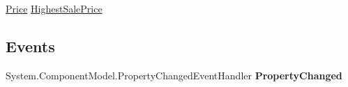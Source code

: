 \begin{DoxyCompactItemize}
\begin{DoxyCompactList}\small\item\em \end{DoxyCompactList}\item 
\hypertarget{class_price___comparison_1_1amazon_1_1ecs_1_1_collections_collection_collection_summary_aff84be041514c4e98b847dba6d03fac7}{\hyperlink{class_price___comparison_1_1amazon_1_1ecs_1_1_price}{Price} \hyperlink{class_price___comparison_1_1amazon_1_1ecs_1_1_collections_collection_collection_summary_aff84be041514c4e98b847dba6d03fac7}{Highest\-Sale\-Price}}\label{class_price___comparison_1_1amazon_1_1ecs_1_1_collections_collection_collection_summary_aff84be041514c4e98b847dba6d03fac7}

\begin{DoxyCompactList}\small\item\em \end{DoxyCompactList}\end{DoxyCompactItemize}
\subsection*{Events}
\begin{DoxyCompactItemize}
\item 
\hypertarget{class_price___comparison_1_1amazon_1_1ecs_1_1_collections_collection_collection_summary_af1001c66b79d948083c5b3a4a3837eaf}{System.\-Component\-Model.\-Property\-Changed\-Event\-Handler {\bfseries Property\-Changed}}\label{class_price___comparison_1_1amazon_1_1ecs_1_1_collections_collection_collection_summary_af1001c66b79d948083c5b3a4a3837eaf}

\end{DoxyCompactItemize}
